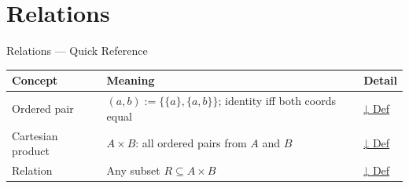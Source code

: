 \section{Relations}


\begin{toolkitbox}{Relations — Quick Reference}
\small
\begin{tabular}{l l l}
\toprule
\textbf{Concept} & \textbf{Meaning} & \textbf{Detail} \\
\midrule
Ordered pair     & $(a,b) := \{\{a\},\{a,b\}\}$; identity iff both coords equal  & \hyperref[def:ordered-pair]{↓ Def} \\
Cartesian product & $A \times B$: all ordered pairs from $A$ and $B$             & \hyperref[def:cartesian-product-rel]{↓ Def} \\
Relation         & Any subset $R \subseteq A \times B$                           & \hyperref[def:relation]{↓ Def} \\
\bottomrule
\end{tabular}
\end{toolkitbox}



